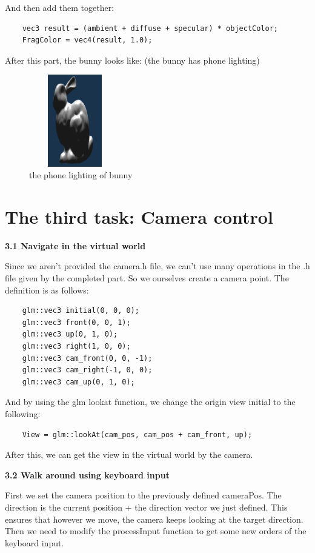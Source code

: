 \documentclass[acmtog]{acmart}
\begin{document}
And then add them together:

\begin{lstlisting}
	vec3 result = (ambient + diffuse + specular) * objectColor;
    FragColor = vec4(result, 1.0);
\end{lstlisting}

After this part, the bunny looks like: (the bunny has phone lighting)
\begin{figure}[h]
\includegraphics[width=4cm,height=4cm]{light_bunny}
\caption{the phone lighting of bunny}
\end{figure}

\section{ The third task: Camera control}

\textbf{3.1 Navigate in the virtual world}

Since we aren't provided the camera.h file, we can't use many operations in the .h file given by the completed part. So we ourselves create a camera point. The definition is as follows:

\begin{lstlisting}
	glm::vec3 initial(0, 0, 0);
	glm::vec3 front(0, 0, 1);
	glm::vec3 up(0, 1, 0);
	glm::vec3 right(1, 0, 0);
	glm::vec3 cam_front(0, 0, -1);
	glm::vec3 cam_right(-1, 0, 0);
	glm::vec3 cam_up(0, 1, 0);
\end{lstlisting}

And by using the glm lookat function, we change the origin view initial to the following:

\begin{lstlisting}
	View = glm::lookAt(cam_pos, cam_pos + cam_front, up);
\end{lstlisting}

After this, we can get the view in the virtual world by the camera.

\textbf{3.2 Walk around using keyboard input}

First we set the camera position to the previously defined cameraPos. The direction is the current position + the direction vector we just defined. This ensures that however we move, the camera keeps looking at the target direction. Then we need to modify the processInput function to get some new orders of the keyboard input.
\end{document}
